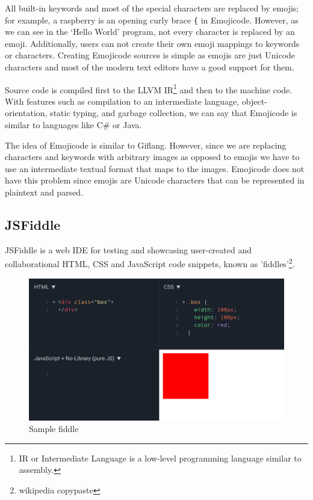 All built-in keywords and most of the special characters are replaced by emojis; for example, a raspberry is an opening curly brace \texttt{\{} in Emojicode.
However, as we can see in the `Hello World' program, not every character is replaced by an emoji. Additionally, users can not create their own emoji
mappings to keywords or characters. Creating Emojicode sources is simple as emojis are just Unicode characters and most of the modern text editors
have a good support for them.

Source code is compiled first to the LLVM IR\footnote{IR or Intermediate Language is a low-level programming language similar to assembly.} and then to
the machine code. With features such as compilation to an intermediate language, object-orientation, static typing, and garbage collection, we can
say that Emojicode is similar to languages like C\# or Java.

The idea of Emojicode is similar to Giflang. However, since we are replacing characters and keywords with arbitrary images as
opposed to emojis we have to use an intermediate textual format that maps to the images. Emojicode does not have this problem since emojis are
Unicode characters that can be represented in plaintext and parsed.

\subsection{JSFiddle}
JSFiddle \cite{JSFiddle} is a web IDE for testing and showcasing user-created and collaborational HTML, CSS and JavaScript code snippets, known as
'fiddles'\footnote{wikipedia copypaste}.

\begin{figure}[!hbt]
    \centering
	\includegraphics[width=\textwidth]{../img/jsfiddle}
	\caption{Sample fiddle}
	\label{fig:chap1:jsfiddle}
\end{figure}

